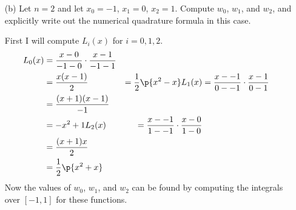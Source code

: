 \documentclass[11pt]{article}
\begin{document}
\begin{enumerate}
\begin{enumerate}
\begin{proof}
\begin{align*}
                        &= (-1)^{n+1} \prod{i=0}{n}{x + x_i}
                        \intertext{Since $n$ is even $(-1)^{n+1} = -1$}
                        &= -\prod{i=0}{n}{x + x_i}
                        \intertext{Since $x_i = -x_{n-i}$}
                        &= -\prod{i=0}{n}{x - x_{n-i}}
                        \intertext{This product is multiplying the same terms as
                            $p(x)$, so this product is equivalent to $p(x)$.}
                        &= -p(x)
                    \end{align*}
                    Therefore $p(x) = \prod{i=0}{n}{x - x_i}$ is an odd function,
                    and so the integral $\dintt{-1}{1}{p(x)}{x} = 0$.
                    Therefore $E(f) = 0$ for $f \in \PP_{n+1}$, and
                    so this numerical quadrature is exact for all polynomials
                    whose degree is at most $n+1$.
                \end{proof}

            \item[(b)] %
                Let $n = 2$ and let $x_0 = -1$, $x_1 = 0$, $x_2 = 1$.
                Compute $w_0$, $w_1$, and $w_2$, and explicitly write out the
                numerical quadrature formula in this case.

                First I will compute $L_i(x)$ for $i = 0, 1, 2$.
                \begin{align*}
                    L_0(x) &= \frac{x - 0}{-1 - 0} \cdot \frac{x-1}{-1-1} \\
                    &= \frac{x(x-1)}{2}
                    &= \frac{1}{2}\p{x^2 - x}
                    L_1(x) &= \frac{x - -1}{0 - -1} \cdot \frac{x - 1}{0 - 1} \\
                    &= \frac{(x + 1)(x - 1)}{-1} \\
                    &= -x^2 + 1
                    L_2(x) &= \frac{x - -1}{1 - -1} \cdot \frac{x - 0}{1 - 0} \\
                    &= \frac{(x + 1)x}{2} \\
                    &= \frac{1}{2}\p{x^2 + x}
                \end{align*}
                Now the values of $w_0$, $w_1$, and $w_2$ can be found by computing
                the integrals over $[-1, 1]$ for these functions.


\end{enumerate}
\end{enumerate}
\end{document}
